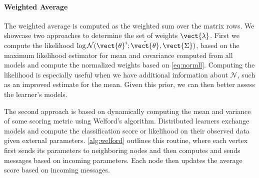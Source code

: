 \paragraph*{Weighted Average}
The weighted average is computed as the weighted sum over the matrix rows.
We showcase two approaches to determine the set of weights $\vect{\lambda}$.
First we compute the likelihood $\log \mathcal{N}(\vect{\theta}^i; \hat{\vect{\theta}}, \vect{\Sigma})$, based on the maximum likelihood estimator for mean and covariance computed from all models and compute the normalized weights based on \autoref{eq:normll}.
Computing the likelihood is especially useful when we have additional information about $\mathcal{N}$, such as an improved estimate for the mean. 
Given this prior, we can then better assess the learner's models.

The second approach is based on dynamically computing the mean and variance of some scoring metric using Welford's algorithm.
Distributed learners exchange models and compute the classification score or likelihood on their observed data given external parameters.
\autoref{alg:welford} outlines this routine, where each vertex first sends its parameters to neighboring nodes and then computes and sends messages based on incoming parameters. 
Each node then updates the average score based on incoming messages.

